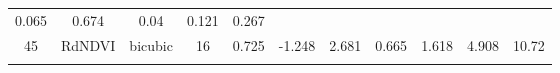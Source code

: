 \documentclass[twoside,12pt,final]{ucthesis-CA2012}
\begin{document}
\begin{ucmainmatter}
\begin{longtable}[]{@{}ccccccccccc@{}}
\begin{minipage}[t]{0.07\columnwidth}
0.065\strut
\end{minipage} & \begin{minipage}[t]{0.07\columnwidth}\centering\strut
0.674\strut
\end{minipage} & \begin{minipage}[t]{0.05\columnwidth}\centering\strut
0.04\strut
\end{minipage} & \begin{minipage}[t]{0.05\columnwidth}\centering\strut
0.121\strut
\end{minipage} & \begin{minipage}[t]{0.05\columnwidth}\centering\strut
0.267\strut
\end{minipage}\tabularnewline
\begin{minipage}[t]{0.04\columnwidth}\centering\strut
45\strut
\end{minipage} & \begin{minipage}[t]{0.11\columnwidth}\centering\strut
RdNDVI\strut
\end{minipage} & \begin{minipage}[t]{0.06\columnwidth}\centering\strut
bicubic\strut
\end{minipage} & \begin{minipage}[t]{0.08\columnwidth}\centering\strut
16\strut
\end{minipage} & \begin{minipage}[t]{0.08\columnwidth}\centering\strut
0.725\strut
\end{minipage} & \begin{minipage}[t]{0.07\columnwidth}\centering\strut
-1.248\strut
\end{minipage} & \begin{minipage}[t]{0.07\columnwidth}\centering\strut
2.681\strut
\end{minipage} & \begin{minipage}[t]{0.07\columnwidth}\centering\strut
0.665\strut
\end{minipage} & \begin{minipage}[t]{0.05\columnwidth}\centering\strut
1.618\strut
\end{minipage} & \begin{minipage}[t]{0.05\columnwidth}\centering\strut
4.908\strut
\end{minipage} & \begin{minipage}[t]{0.05\columnwidth}\centering\strut
10.72\strut
\end{minipage}\tabularnewline
\begin{minipage}[t]{0.04\columnwidth}\centering\strut

\end{minipage}
\end{longtable}
\end{ucmainmatter}
\end{document}
